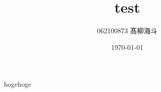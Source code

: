 \documentclass[uplatex,dvipdfmx,ja=standard,a4paper]{bxjsarticle}
\begin{document}
\title{test}
\author{062100873 髙柳海斗}
\date{\today}
\maketitle

hogehoge
\end{document}
